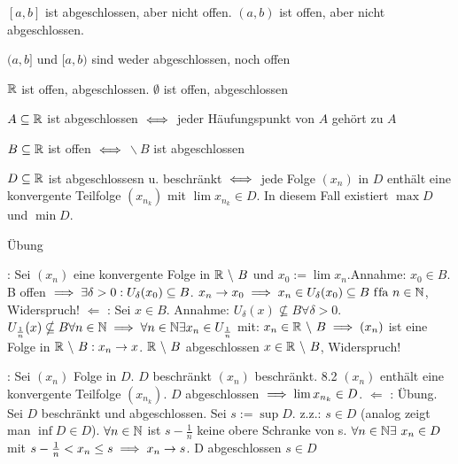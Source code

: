 \documentclass[a4paper,oneside,DIV15,BCOR12mm]{scrbook}
\begin{document}
\begin{beispiele}
\item $[a, b]$ ist abgeschlossen, aber nicht offen. $(a, b)$ ist offen, aber nicht abgeschlossen.
\item $(a, b]$ und $[a, b)$ sind weder abgeschlossen, noch offen
\item $\mathbb{R}$ ist offen, abgeschlossen. $\emptyset$ ist offen, abgeschlossen
\end{beispiele}


\begin{hilfssatz*}
\begin{liste}
\item $A \subseteq \mathbb{R}$ ist abgeschlossen $\iff$ jeder Häufungspunkt von $A$ gehört zu $A$
\item $B \subseteq \mathbb{R}$ ist offen $\iff$ \MdR$ \backslash\ B$ ist abgeschlossen
\item $D \subseteq \mathbb{R}$ ist abgeschlossesn u. beschränkt $\iff$ jede Folge $(x_n)$ in $D$ enthält eine konvergente Teilfolge $(x_{n_k})$ mit $\lim x_{n_k} \in D$. In diesem Fall existiert $\max D$ und $\min D$.
\end{liste}
\end{hilfssatz*}

\begin{beweis}
\begin{liste}
\item Übung
\item \glqq \folgt \grqq: Sei $(x_n)$ eine konvergente Folge in $\MdR\ \backslash\ B$ und $x_0:=\lim x_n$.Annahme: $x_0 \in B$. B offen $\implies \exists \delta>0 : U_\delta(x_0) \subseteq B$. $x_n \to x_0 \implies x_n \in U_\delta(x_0) \subseteq B \text{ f\/fa } n \in\mathbb{N}$, Widerspruch! \glqq $\Leftarrow$ \grqq: Sei $x \in B$. Annahme: $U_\delta(x) \nsubseteq B \forall \delta>0$. 
\folgt $U_{\frac{1}{n}}(x) \nsubseteq B \forall n \in \mathbb{N} 
\implies \forall n \in \mathbb{N} \exists x_n \in U_{\frac{1}{n}}$ mit: $x_n \in \mathbb{R}\ \backslash\ B \implies (x_n)$ ist eine Folge in $\MdR\ \backslash\ B: x_n \to x$. $\MdR\ \backslash\ B$ abgeschlossen \folgt $x \in \mathbb{R}\ \backslash\ B$, Widerspruch!
\item \glqq \folgt \grqq: Sei $(x_n)$ Folge in $D$. $D$ beschränkt \folgt $(x_n)$ beschränkt. 8.2 \folgt $(x_n)$ enthält eine konvergente Teilfolge $(x_{n_k})$. $D$ abgeschlossen $\implies \lim x_{n_k} \in D$. \glqq $\Leftarrow$ \grqq: Übung. Sei $D$ beschränkt und abgeschlossen. Sei $s:=\sup D$. z.z.: $s \in D$ (analog zeigt man $\inf D \in D$). $\forall n \in \mathbb{N}$ ist $s-\frac{1}{n}$ keine obere Schranke von s. \folgt $\forall n \in\mathbb{N}\exists\ x_n \in D$ mit $s - \frac{1}{n} < x_n \le s \implies x_n \to s$. D abgeschlossen \folgt $s \in D$
\end{liste}
\end{beweis}
\end{document}
